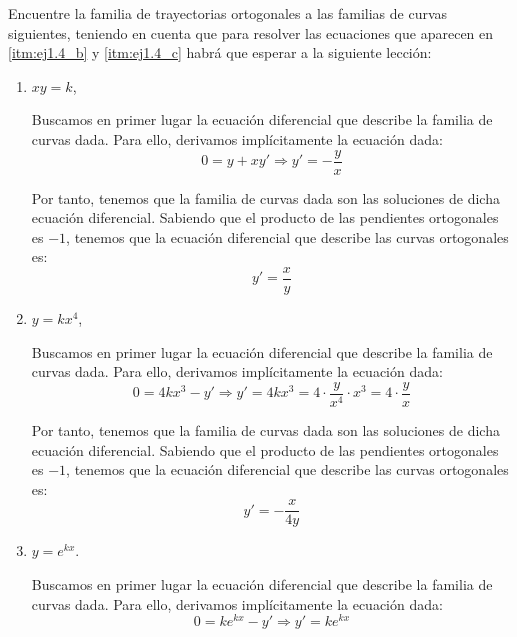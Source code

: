 \begin{ejercicio}
    Encuentre la familia de trayectorias ortogonales a las familias de curvas siguientes, teniendo en cuenta que para resolver las ecuaciones que aparecen en \ref{itm:ej1.4_b} y \ref{itm:ej1.4_c} habrá que esperar a la siguiente lección:
    \begin{enumerate}
        \item \(xy = k\),
        
        Buscamos en primer lugar la ecuación diferencial que describe la familia de curvas dada. Para ello, derivamos implícitamente la ecuación dada:
        \begin{equation*}
            0 = y + xy' \Longrightarrow y' = -\dfrac{y}{x}
        \end{equation*}

        Por tanto, tenemos que la familia de curvas dada son las soluciones de dicha ecuación diferencial.
        Sabiendo que el producto de las pendientes ortogonales es $-1$, tenemos que la ecuación diferencial que describe las curvas ortogonales es:
        \begin{equation*}
            y' = \dfrac{x}{y}
        \end{equation*}
        
        \item\label{itm:ej1.4_b} \(y = kx^4\),
        
        Buscamos en primer lugar la ecuación diferencial que describe la familia de curvas dada. Para ello, derivamos implícitamente la ecuación dada:
        \begin{equation*}
            0 = 4kx^3 - y' \Longrightarrow y' = 4kx^3 = 4\cdot \dfrac{y}{x^4} \cdot x^3 = 4\cdot \dfrac{y}{x}
        \end{equation*}

        Por tanto, tenemos que la familia de curvas dada son las soluciones de dicha ecuación diferencial.
        Sabiendo que el producto de las pendientes ortogonales es $-1$, tenemos que la ecuación diferencial que describe las curvas ortogonales es:
        \begin{equation*}
            y' = -\dfrac{x}{4y}
        \end{equation*}
        \item\label{itm:ej1.4_c} \(y = e^{kx}\).
        
        Buscamos en primer lugar la ecuación diferencial que describe la familia de curvas dada. Para ello, derivamos implícitamente la ecuación dada:
        \begin{equation*}
            0 = ke^{kx} - y' \Longrightarrow y' = ke^{kx}
        \end{equation*}


\end{enumerate}
\end{ejercicio}
